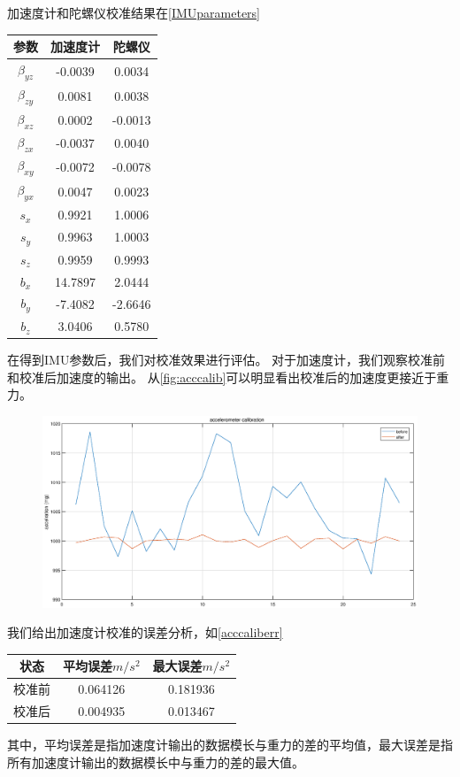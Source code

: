 \documentclass[
  type=master
]{gdutthesis}
\begin{document}
加速度计和陀螺仪校准结果在\autoref{IMUparameters}
\begin{table}[htbp]
	\label{IMUparameters}
	\begin{tabular}{ccc}
		\toprule
		参数 & 加速度计 & 陀螺仪 \\
		\midrule
		$\beta_{yz}$ & -0.0039 & 0.0034\\
		$\beta_{zy}$ & 0.0081 & 0.0038\\
		$\beta_{xz}$ & 0.0002 & -0.0013\\
		$\beta_{zx}$ & -0.0037 & 0.0040\\
		$\beta_{xy}$ & -0.0072 & -0.0078\\
		$\beta_{yx}$ & 0.0047 & 0.0023\\
		$s_x$ & 0.9921 & 1.0006\\
		$s_y$ & 0.9963 & 1.0003\\
		$s_z$ & 0.9959 & 0.9993\\
		$b_x$ & 14.7897 & 2.0444\\
		$b_y$ & -7.4082 & -2.6646\\
		$b_z$ & 3.0406 & 0.5780\\
		\bottomrule
	\end{tabular}
\end{table}
在得到IMU参数后，我们对校准效果进行评估。
对于加速度计，我们观察校准前和校准后加速度的输出。
从\autoref{fig:acccalib}可以明显看出校准后的加速度更接近于重力。
\begin{figure}[htbp]
	\centering
	\includegraphics[width=1.0\textwidth]{acccalib.eps}
	\label{fig:acccalib}
\end{figure}
我们给出加速度计校准的误差分析，如\autoref{acccaliberr}
\begin{table}[htbp]
	\label{acccaliberr}
	\begin{tabular}{ccc}
		\toprule
		状态 & 平均误差$m/s^2$ & 最大误差$m/s^2$ \\
		\midrule
		校准前 & 0.064126 & 0.181936 \\
		校准后 & 0.004935 & 0.013467 \\
		\bottomrule
	\end{tabular}
\end{table}
其中，平均误差是指加速度计输出的数据模长与重力的差的平均值，最大误差是指所有加速度计输出的数据模长中与重力的差的最大值。
\end{document}
